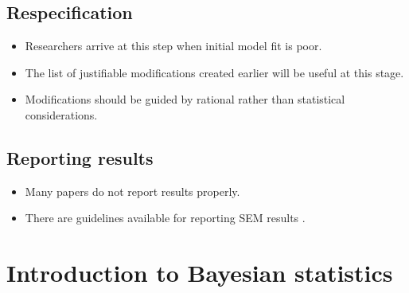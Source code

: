 \documentclass[
  a4paper,
  DIV=11,
  numbers=noendperiod]{scrreprt}
\providecommand{\tightlist}{%
  \setlength{\itemsep}{0pt}\setlength{\parskip}{0pt}}\usepackage{longtable,booktabs,array}
\begin{document}
\section{Respecification}\label{respecification}

\begin{itemize}
\tightlist
\item
  Researchers arrive at this step when initial model fit is poor.
\item
  The list of justifiable modifications created earlier will be useful
  at this stage.
\item
  Modifications should be guided by rational rather than statistical
  considerations.
\end{itemize}

\section{Reporting results}\label{reporting-results}

\begin{itemize}
\tightlist
\item
  Many papers do not report results properly.
\item
  There are guidelines available for reporting SEM results \citep[p 464,
  \citet{Appelbaum2018}, pp 16-19]{Boomsma2012, Kline2016}.
\end{itemize}


\chapter{Introduction to Bayesian
statistics}\label{introduction-to-bayesian-statistics}
\end{document}
